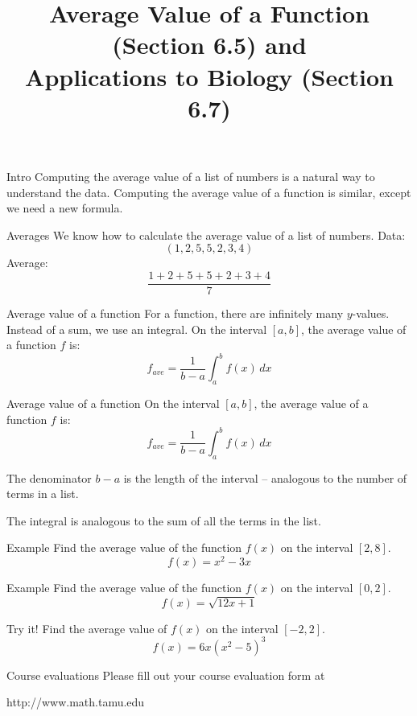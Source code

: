 \documentclass[t]{beamer}
\title{Average Value of a Function (Section 6.5) and \\
Applications to Biology (Section 6.7)}
\date{}
\begin{document}
\frame{\titlepage}

\begin{frame}{Intro}
Computing the average value of a list of numbers is a 
natural way to understand the data.  Computing the
average value of a function is similar, except we need
a new formula.
\end{frame}

\begin{frame}{Averages}
We know how to calculate the average value of a list of numbers.
Data: 
$$(1,2,5,5,2,3,4)$$
Average:
$$\frac{1 + 2 + 5 + 5 + 2 + 3 + 4}{7}$$
\end{frame}

\begin{frame}{Average value of a function}
For a function, there are infinitely many $y$-values. Instead of a 
sum, we use an integral.  On the interval $[a,b]$, the average 
value of a function $f$ is:
$$f_{ave} = \frac{1}{b - a} \int_a^b f(x) \, dx$$
\end{frame}

\begin{frame}{Average value of a function}
On the interval $[a,b]$, the average 
value of a function $f$ is:
$$f_{ave} = \frac{1}{b - a} \int_a^b f(x) \, dx$$

The denominator $b - a$ is the length of the interval -- analogous to the
number of terms in a list.

The integral is analogous to the sum of all the terms in the list.
\end{frame}

\begin{frame}{Example}
Find the average value of the function $f(x)$ on the interval $[2,8]$.
$$f(x) = x^2 - 3x$$
\end{frame}

\begin{frame}{Example}
Find the average value of the function $f(x)$ on the interval $[0,2]$.
$$f(x) = \sqrt{12x + 1}$$
\end{frame}

\begin{frame}{Try it!}
Find the average value of $f(x)$ on the interval $[-2,2]$.
$$f(x) = 6x (x^2-5)^3$$
\end{frame}

\begin{frame}{Course evaluations}
Please fill out your course evaluation form at

http://www.math.tamu.edu
\end{frame}
\end{document}
